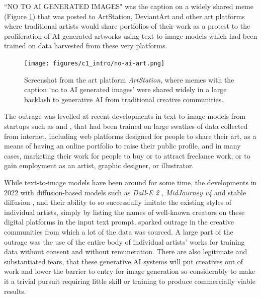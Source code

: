 “NO TO AI GENERATED IMAGES" was the caption on a widely shared meme (Figure \ref{fig:c1:no-ai-art}) that was posted to ArtStation, DeviantArt and other art platforms where traditional artists would share portfolios of their work as a protest to the proliferation of AI-generated artworks using text to image models which had been trained on data harvested from these very platforms. 

\begin{figure}[!htb]
    \centering
    \captionsetup{justification=centering}
    \texttt{[image: figures/c1\_intro/no-ai-art.png]}
    \caption['No-AI memes being shared on the platform ArtStation]{Screenshot from the art platform \textit{ArtStation}, where memes with the caption `no to AI generated images' were shared widely in a large backlash to generative AI from traditional creative communities.}
    \label{fig:c1:no-ai-art}
\end{figure}

The outrage was levelled at recent developments in text-to-image models from startups such as \cite{midjourney2023midjourney} and \cite{stability2023stability}, that had been trained on large swathes of data collected from internet, including web platforms designed for people to share their art, as a means of having an online portfolio to raise their public profile, and in many cases, marketing their work for people to buy or to attract freelance work, or to gain employment as an artist, graphic designer, or illustrator.

While text-to-image models have been around for some time, the developments in 2022 with diffusion-based models such as \textit{Dall-E 2} \citep{openai2022dalle2}, \textit{MidJourney v4} \citep{edwards2022midjourney} and stable diffusion \citep{stability2022stable}, and their ability to so successfully imitate the existing styles of individual artists, simply by listing the names of well-known creators on these digital platforms in the input text prompt, sparked outrage in the creative communities from which a lot of the data was sourced. 
A large part of the outrage was the use of the entire body of individual artists' works for training data without consent and without remuneration.
There are also legitimate and substantiated fears, that these generative AI systems will put creatives out of work and lower the barrier to entry for image generation so considerably to make it a trivial pursuit requiring little skill or training to produce commercially viable results.

